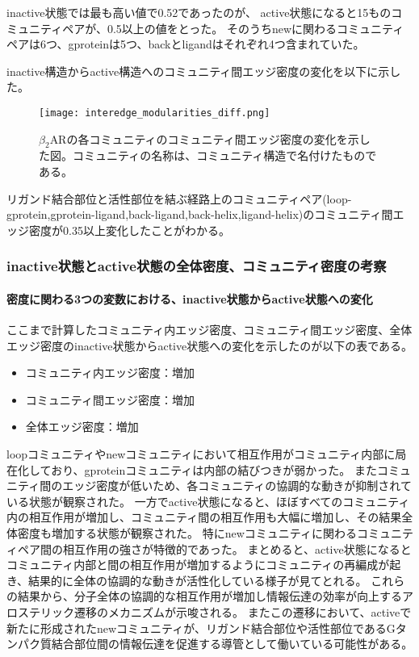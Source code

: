 inactive状態では最も高い値で0.52であったのが、
active状態になると15ものコミュニティペアが、0.5以上の値をとった。
そのうちnewに関わるコミュニティペアは6つ、gproteinは5つ、backとligandはそれぞれ4つ含まれていた。

inactive構造からactive構造へのコミュニティ間エッジ密度の変化を以下に示した。

\begin{figure}[htbp]
  \centering
  \texttt{[image: interedge\_modularities\_diff.png]}
  \caption{$\beta_2$ARの各コミュニティのコミュニティ間エッジ密度の変化を示した図。コミュニティの名称は、コミュニティ構造で名付けたものである。}
  \label{fig:inter_diff}
\end{figure}

\newpage

リガンド結合部位と活性部位を結ぶ経路上のコミュニティペア(loop-gprotein,gprotein-ligand,back-ligand,back-helix,ligand-helix)のコミュニティ間エッジ密度が0.35以上変化したことがわかる。

\subsubsection{inactive状態とactive状態の全体密度、コミュニティ密度の考察}


\paragraph{密度に関わる3つの変数における、inactive状態からactive状態への変化}

ここまで計算したコミュニティ内エッジ密度、コミュニティ間エッジ密度、全体エッジ密度のinactive状態からactive状態への変化を示したのが以下の表である。
\begin{itemize}
    \item コミュニティ内エッジ密度：増加
    \item コミュニティ間エッジ密度：増加
    \item 全体エッジ密度：増加
\end{itemize}



loopコミュニティやnewコミュニティにおいて相互作用がコミュニティ内部に局在化しており、gproteinコミュニティは内部の結びつきが弱かった。
またコミュニティ間のエッジ密度が低いため、各コミュニティの協調的な動きが抑制されている状態が観察された。
一方でactive状態になると、ほぼすべてのコミュニティ内の相互作用が増加し、コミュニティ間の相互作用も大幅に増加し、その結果全体密度も増加する状態が観察された。
特にnewコミュニティに関わるコミュニティペア間の相互作用の強さが特徴的であった。
まとめると、active状態になるとコミュニティ内部と間の相互作用が増加するようにコミュニティの再編成が起き、結果的に全体の協調的な動きが活性化している様子が見てとれる。
これらの結果から、分子全体の協調的な相互作用が増加し情報伝達の効率が向上するアロステリック遷移のメカニズムが示唆される。
またこの遷移において、activeで新たに形成されたnewコミュニティが、リガンド結合部位や活性部位であるGタンパク質結合部位間の情報伝達を促進する導管として働いている可能性がある。

